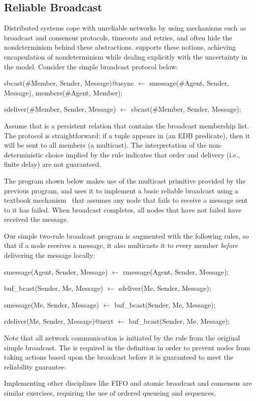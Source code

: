 \subsection{Reliable Broadcast}
Distributed systems cope with unreliable networks by using mechanisms such as broadcast and consensus protocols, 
timeouts and retries, and often hide the nondeterminism behind these abstractions.  \lang supports these notions,
achieving encapsulation of nondeterminism while dealing explicitly with the uncertainty in the model.  Consider the simple
broadcast protocol below:

\begin{Dedalus}
sbcast(#Member, Sender, Message)@async \(\leftarrow\)
  smessage(#Agent, Sender, Message),
  members(#Agent, Member);

sdeliver(#Member, Sender, Message) \(\leftarrow\)
  sbcast(#Member, Sender, Message);
\end{Dedalus}

Assume that  is a persistent relation that contains the broadcast 
membership list.  
The protocol is straightforward: if a tuple appears in  (an EDB predicate), then
it will be sent to all members (a multicast).  The interpretation of the non-deterministic choice implied by the
 rule indicates that order and delivery (i.e., finite delay) are not guaranteed.

The program shown below makes use of the
multicast primitive provided by the previous program, and uses it
to implement a basic reliable broadcast using a textbook
mechanism~\cite{mullender} that assumes any node that fails to receive
a message sent to it has failed.  When broadcast completes, all nodes
that have not failed have received the message.

Our simple two-rule broadcast program is augmented with the following rules, so that if a node receives a message, it 
also multicasts it to every member \emph{before} delivering the message locally:

\begin{Dedalus}
smessage(Agent, Sender, Message)  \(\leftarrow\)
  rmessage(Agent, Sender, Message);

buf_bcast(Sender, Me, Message)  \(\leftarrow\)
  sdeliver(Me, Sender, Message);

smessage(Me, Sender, Message)  \(\leftarrow\)
  buf_bcast(Sender, Me, Message);

rdeliver(Me, Sender, Message)@next  \(\leftarrow\)
  buf_bcast(Sender, Me, Message);
\end{Dedalus}

Note that all network communication is initiated by the
 rule from the original simple broadcast.  The  is
required in the  definition in order to prevent nodes from
taking actions based upon the broadcast before it is guaranteed to
meet the reliability guarantee.

Implementing other disciplines like FIFO and atomic broadcast and
consensus are similar exercises, requiring the use of ordered queueing
and sequences.
